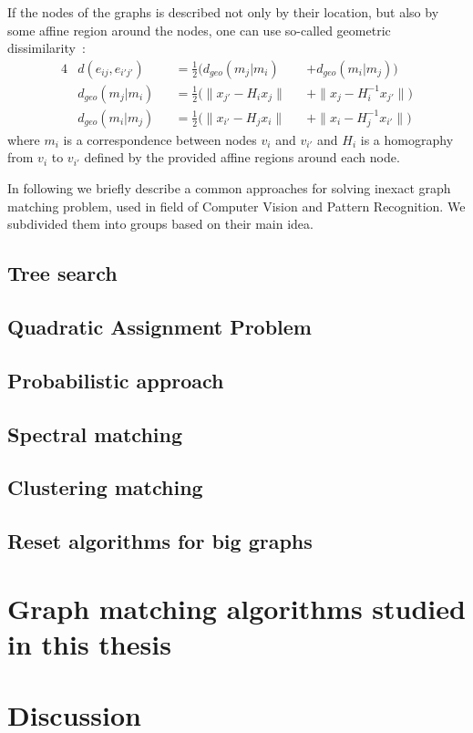\begin{itemize}
	If the nodes of the graphs is described not only by their location, but also by some affine region around the nodes, one can use so-called geometric dissimilarity~\cite{Cho2009_AgglClustering,Cho2012_ProgressiveGM}:
	\begin{alignat}{4}
	& d(e_{ij},e_{i'j'}) && =\frac{1}{2}(d_{geo}(m_j|m_i) && +d_{geo}(m_i|m_j)) \\
	& d_{geo}(m_j|m_i) && =\frac{1}{2}(\|x_{j'}-H_{i}x_j\| && + \|x_{j}-H^{-1}_ix_{j'}\|) \\
	& d_{geo}(m_i|m_j) && =\frac{1}{2}(\|x_{i'}-H_{j}x_i\| && + \|x_{i}-H^{-1}_{j}x_{i'}\|) 
	\end{alignat}
	where $m_i$ is a correspondence between nodes $v_i$ and $v_{i'}$ and $H_i$ is a homography from $v_i$ to $v_{i'}$ defined by the provided affine regions around each node.
\end{itemize}
\vspace{-5pt}

In following we briefly describe a common approaches for solving inexact graph matching problem, used in field of Computer Vision and Pattern Recognition. We subdivided them into groups based on their main idea.

\subsection{Tree search}

\subsection{Quadratic Assignment Problem}

\subsection{Probabilistic approach}

\subsection{Spectral matching}

\subsection{Clustering matching}

\subsection{Reset algorithms for big graphs}










\section{Graph matching algorithms studied in this thesis}

\section{Discussion}